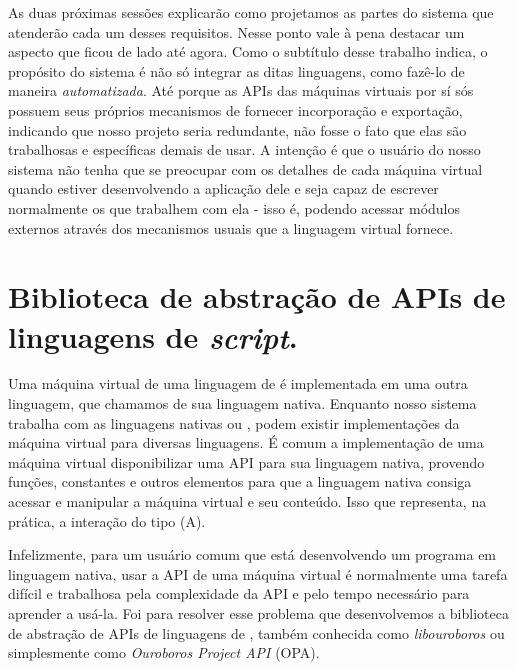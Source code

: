     As duas próximas sessões explicarão como projetamos as partes do sistema
    que atenderão cada um desses requisitos. Nesse ponto vale à pena destacar
    um aspecto que ficou de lado até agora. Como o subtítulo desse trabalho
    indica, o propósito do sistema é não só integrar as ditas linguagens, como
    fazê-lo de maneira \textit{automatizada}. Até porque as APIs das máquinas
    virtuais por sí sós possuem seus próprios mecanismos de fornecer
    incorporação e exportação, indicando que nosso projeto seria redundante,
    não fosse o fato que elas são trabalhosas e específicas demais de usar. A
    intenção é que o usuário do nosso sistema não tenha que se preocupar com os
    detalhes de cada máquina virtual quando estiver desenvolvendo a aplicação
    dele e seja capaz de escrever normalmente os  que trabalhem com
    ela - isso é, podendo acessar módulos externos através dos mecanismos usuais 
    que a linguagem virtual fornece.

  \section{Biblioteca de abstração de APIs de linguagens de \emph{script}.}
  \label{sec:estrutura:opa}
  
    Uma máquina virtual de uma linguagem de \script{} é implementada em uma outra
    linguagem, que chamamos de sua linguagem nativa. Enquanto nosso sistema trabalha
    com as linguagens nativas \C{} ou \CXX{}, podem existir implementações da máquina
    virtual para diversas linguagens. É comum a implementação de uma máquina virtual
    disponibilizar uma API para sua linguagem nativa, provendo funções, constantes
    e outros elementos para que a linguagem nativa consiga acessar e manipular a
    máquina virtual e seu conteúdo. Isso que representa, na prática, a interação do
    tipo (A).

    Infelizmente, para um usuário comum que está desenvolvendo um programa em
    linguagem nativa, usar a API de uma máquina virtual é normalmente uma tarefa
    difícil e trabalhosa pela complexidade da API e pelo tempo necessário para
    aprender a usá-la. Foi para resolver esse problema que desenvolvemos a
    biblioteca de abstração de APIs de linguagens de \script{}, também conhecida
    como \textit{libouroboros} ou simplesmente como \emph{Ouroboros Project API}
    (OPA).
    
